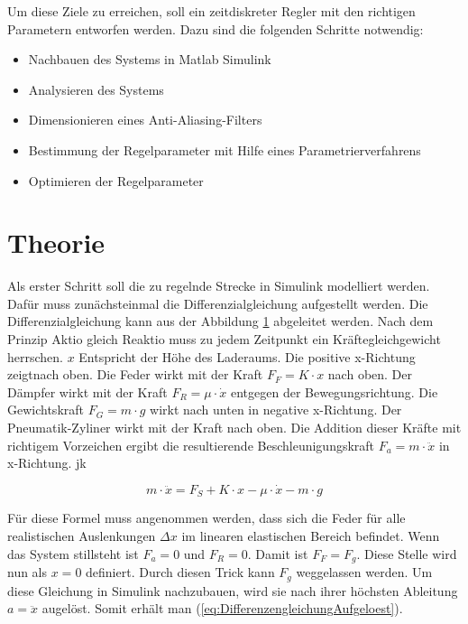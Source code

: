 	Um diese Ziele zu erreichen, soll ein zeitdiskreter Regler mit den
	richtigen Parametern entworfen werden. Dazu sind die
	folgenden Schritte notwendig:



	\begin{itemize}
		\item Nachbauen des Systems in Matlab Simulink
		\item Analysieren des Systems
		\item Dimensionieren eines Anti-Aliasing-Filters
		\item Bestimmung der Regelparameter mit Hilfe eines Parametrierverfahrens
		\item Optimieren der Regelparameter
	\end{itemize}
		
	\section{Theorie}
	Als erster Schritt soll die zu regelnde Strecke in Simulink modelliert werden. Dafür muss zunächsteinmal die Differenzialgleichung aufgestellt werden.
	Die Differenzialgleichung kann aus der Abbildung \ref{} abgeleitet werden. 
	Nach dem Prinzip Aktio gleich Reaktio muss zu jedem Zeitpunkt ein Kräftegleichgewicht herrschen.
	$x$ Entspricht der Höhe des Laderaums. Die positive x-Richtung zeigtnach oben. Die Feder wirkt mit der Kraft $F_{F} = K \cdot x$ nach oben. Der Dämpfer wirkt mit der Kraft 
	$F_{R} = \mu \cdot \dot{x}$ entgegen der Bewegungsrichtung. Die Gewichtskraft $F_{G} = m \cdot g $ wirkt nach unten in negative x-Richtung. Der Pneumatik-Zyliner 
	wirkt mit der Kraft  nach oben. Die Addition dieser Kräfte mit richtigem Vorzeichen ergibt die resultierende Beschleunigungskraft $F_{a} = m \cdot \ddot{x}$
	in x-Richtung. jk

	\begin{equation}
		m \cdot \ddot{x} = F_{S} + K \cdot x - \mu \cdot \dot{x} - m \cdot g
		\label{eq:Differenzengleichung}
	\end{equation}

	Für diese Formel muss angenommen werden, dass sich die Feder für alle realistischen Auslenkungen $\Delta x$ im linearen elastischen Bereich befindet. Wenn das System stillsteht ist $F_{a} = 0$ 
	und $F_{R} = 0$. Damit ist $F_{F} = F_{g}$. Diese Stelle wird nun als $x = 0$ definiert. Durch diesen Trick kann $F_{g}$ weggelassen werden. 
	Um diese Gleichung in Simulink nachzubauen, wird sie nach ihrer höchsten Ableitung $a = \ddot{x}$ augelöst. Somit erhält man (\ref{eq:DifferenzengleichungAufgeloest}).

